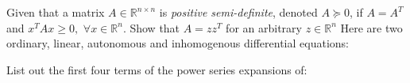 \documentclass[12pt,dvipsnames,addpoints]{exam}
\begin{document}
\begin{questions}
    \question[2] Given that a matrix $A\in\mathbb{R}^{n\times n}$ is \emph{positive semi-definite}, denoted $A\succeq 0$, if $A=A^T$ and $x^T Ax \geq 0, \,\,\forall x\in \mathbb{R}^n$. Show that $A = zz^T$ for an arbitrary $z\in\mathbb{R}^n$\label{q:psd}
    \question Here are two ordinary, linear, autonomous and inhomogenous differential equations:
    \question[6] List out the first four terms of the power series expansions of:
\end{questions}
\end{document}
